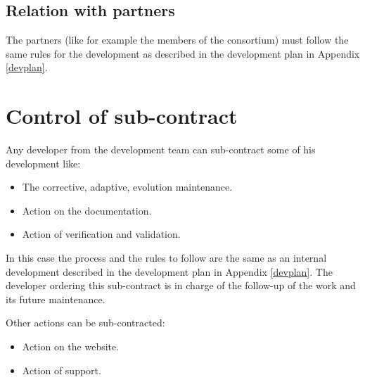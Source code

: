 \subsection{Relation with partners}

The partners (like for example the members of the \telemacsystem consortium) must
follow the same rules for the development as described in the development plan
in Appendix \ref{devplan}.

\section{Control of sub-contract}

Any developer from the development team can sub-contract some of his
development like:
\begin{itemize}
\item The corrective, adaptive, evolution maintenance.
\item Action on the documentation.
\item Action of verification and validation.
\end{itemize}

In this case the process and the rules to follow are the same as an internal
development described in the development plan in Appendix \ref{devplan}. The
developer ordering this sub-contract is in charge of the follow-up of the work
and its future maintenance.

Other actions can be sub-contracted:
\begin{itemize}
\item Action on the website.
\item Action of support.
\end{itemize}
